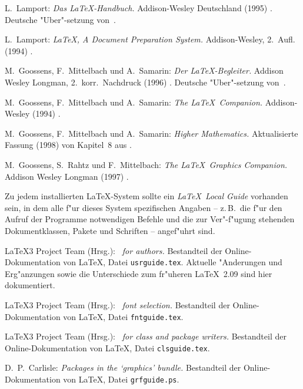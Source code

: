 \documentclass[11pt,a4paper]{article} %
\begin{document}
\begin{thebibliography}{99}  %
 
L.~Lamport: \textit{Das \LaTeX-Handbuch.}
Addison-Wesley Deutschland (1995)%
. Deutsche "Uber"-setzung von~\cite{manual-eng}.

L.~Lamport: \textit{\LaTeX, A Document Preparation System.}
Ad\-di\-son-Wesley, 2.~Aufl. (1994)%
.
 
M.~Goossens, F.~Mittelbach und A.~Samarin:
\textit{Der \LaTeX-Begleiter.}
Ad\-di\-son Wesley Longman, 2.~korr.\ Nachdruck (1996)%
.  Deutsche "Uber"-setzung von~\cite{wonne-eng}.

M.~Goossens, F.~Mittelbach und A.~Samarin:
\textit{The \LaTeX\ Companion.}
Ad\-di\-son-Wesley (1994)%
.  

M.~Goossens, F.~Mittelbach und A.~Samarin:
\textit{Higher Mathematics.} 
Aktualisierte Fassung (1998) von Kapitel\ 8 aus \cite{wonne-eng}.\\


M.~Goossens, S.~Rahtz und F.~Mittelbach:
\textit{The \LaTeX\ Graphics Companion.}
Addison Wesley Longman (1997)%
.

Zu jedem installierten \LaTeX-System sollte ein
\emph{\LaTeX\ Local Guide} vorhanden sein, in dem alle f"ur
dieses System spezifischen Angaben -- z.\,B.~die f"ur den
Aufruf der Programme notwendigen Befehle und die zur Ver"-f"ugung
stehenden Dokumentklassen, Pakete und Schriften -- angef"uhrt sind.
 
\LaTeX3 Project Team (Hrsg.): 
\textit{\LaTeXe\ for authors.} 
Bestandteil der Online-Dokumentation von \LaTeX,
Datei \texttt{usrguide.tex}.  
Aktuelle "Anderungen und Erg"anzungen sowie die Unterschiede zum fr"uheren 
\LaTeX~2.09 sind hier dokumentiert.

\LaTeX3 Project Team (Hrsg.): 
\textit{\LaTeXe\ font selection.}
Bestandteil der Online-Dokumentation von \LaTeX,
Datei \texttt{fntguide.tex}.

\LaTeX3 Project Team (Hrsg.): 
\textit{\LaTeXe\ for class and package writers.}
Bestandteil der Online-Dokumentation von \LaTeX,
Datei \texttt{clsguide.tex}.

D.~P.~Carlisle: \textit{Packages in the `graphics' bundle.}
Bestandteil der Online-Dokumentation von \LaTeX,
Datei \texttt{grfguide.ps}.


\end{thebibliography}
\end{document}
